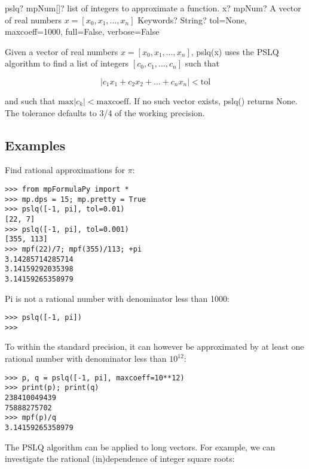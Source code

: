 \begin{mpFunctionsExtract}
	\mpFunctionTwo
	{pslq? mpNum[]? list of integers to approximate a function.}
	{x? mpNum? A vector of real numbers $x=[x_0,x_1,\ldots,x_n]$}
	{Keywords? String?  tol=None, maxcoeff=1000, full=False, verbose=False}	
\end{mpFunctionsExtract}


Given a vector of real numbers $x=[x_0,x_1,\ldots,x_n]$, pslq(x) uses the PSLQ algorithm to find a list of integers $[c_0,c_1,\ldots,c_n]$ such that 

\begin{equation}
|c_1x_1 + c_2x_2 + \ldots + c_nx_n| < \text{tol}
\end{equation}

and such that $\text{max}|c_k|<\text{maxcoeff}$. If no such vector exists, pslq() returns None. The tolerance defaults to 3/4 of the working precision.



\subsection{Examples}

Find rational approximations for $\pi$:

\begin{lstlisting}
>>> from mpFormulaPy import *
>>> mp.dps = 15; mp.pretty = True
>>> pslq([-1, pi], tol=0.01)
[22, 7]
>>> pslq([-1, pi], tol=0.001)
[355, 113]
>>> mpf(22)/7; mpf(355)/113; +pi
3.14285714285714
3.14159292035398
3.14159265358979
\end{lstlisting}

Pi is not a rational number with denominator less than 1000:

\begin{lstlisting}
>>> pslq([-1, pi])
>>>
\end{lstlisting}


To within the standard precision, it can however be approximated by at least one rational number with denominator less than $10^{12}$:

\begin{lstlisting}
>>> p, q = pslq([-1, pi], maxcoeff=10**12)
>>> print(p); print(q)
238410049439
75888275702
>>> mpf(p)/q
3.14159265358979
\end{lstlisting}


The PSLQ algorithm can be applied to long vectors. For example, we can investigate the rational (in)dependence of integer square roots:

